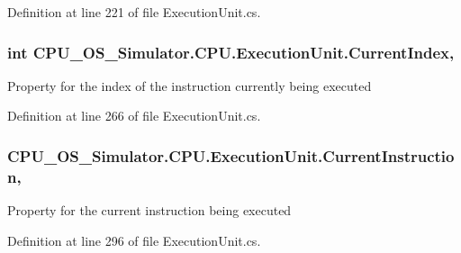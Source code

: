 Definition at line 221 of file Execution\+Unit.\+cs.

\hypertarget{class_c_p_u___o_s___simulator_1_1_c_p_u_1_1_execution_unit_a14d2a23bdc679ed2758733f34f79db63}{}
\subsubsection[{Current\+Index}]{\setlength{\rightskip}{0pt plus 5cm}int C\+P\+U\+\_\+\+O\+S\+\_\+\+Simulator.\+C\+P\+U.\+Execution\+Unit.\+Current\+Index\hspace{0.3cm}{\ttfamily [get]}, {\ttfamily [set]}}\label{class_c_p_u___o_s___simulator_1_1_c_p_u_1_1_execution_unit_a14d2a23bdc679ed2758733f34f79db63}


Property for the index of the instruction currently being executed 



Definition at line 266 of file Execution\+Unit.\+cs.

\hypertarget{class_c_p_u___o_s___simulator_1_1_c_p_u_1_1_execution_unit_a285d7b487a3ac5eff07c640e438ceb11}{}
\subsubsection[{Current\+Instruction}]{ C\+P\+U\+\_\+\+O\+S\+\_\+\+Simulator.\+C\+P\+U.\+Execution\+Unit.\+Current\+Instruction\hspace{0.3cm}{\ttfamily [get]}, {\ttfamily [set]}}\label{class_c_p_u___o_s___simulator_1_1_c_p_u_1_1_execution_unit_a285d7b487a3ac5eff07c640e438ceb11}


Property for the current instruction being executed 



Definition at line 296 of file Execution\+Unit.\+cs.

